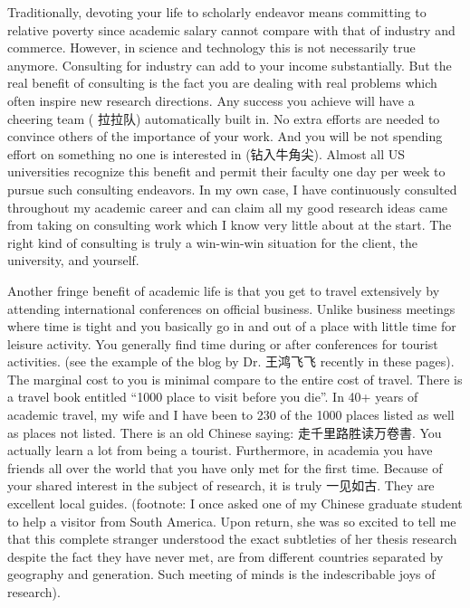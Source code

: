 \documentclass{article}
\begin{document}
Traditionally, devoting your life to scholarly endeavor means committing to relative poverty since academic salary cannot compare with that of industry and commerce. However, in science and technology this is not necessarily true anymore. Consulting for industry can add to your income substantially. But the real benefit of consulting is the fact you are dealing with real problems which often inspire new research directions. Any success you achieve will have a cheering team ( 拉拉队) automatically built in. No extra efforts are needed to convince others of the importance of your work. And you will be not spending effort on something no one is interested in (钻入牛角尖).  Almost all US universities recognize this benefit and permit their faculty one day per week to pursue such consulting endeavors. In my own case, I have continuously consulted throughout my academic career and can claim all my good research ideas came from taking on consulting work which I know very little about at the start. The right kind of consulting is truly a win-win-win situation for the client, the university, and yourself.


Another fringe benefit of academic life is that you get to travel extensively by attending international conferences on official business. Unlike business meetings where time is tight and you basically go in and out of a place with little time for leisure activity.  You generally find time during or after conferences for tourist activities. (see the example of the blog by Dr. 王鸿飞飞  recently in these pages).  The marginal cost to you is minimal compare to the entire cost of travel. There is a travel book entitled “1000 place to visit before you die”. In 40+ years of academic travel, my wife and I have been to 230 of the 1000 places listed as well as places not listed. There is an old Chinese saying: 走千里路胜读万卷書. You actually learn a lot from being a tourist.  Furthermore, in academia you have friends all over the world that you have only met for the first time. Because of your shared interest in the subject of research, it is truly 一见如古. They are excellent local guides. (footnote: I once asked one of my Chinese graduate student to help a visitor from South America. Upon return, she was so excited to tell me that this complete stranger understood the exact subtleties of her thesis research despite the fact they have never met, are from different countries separated by geography and generation. Such meeting of minds is the indescribable joys of research). 
\end{document}
